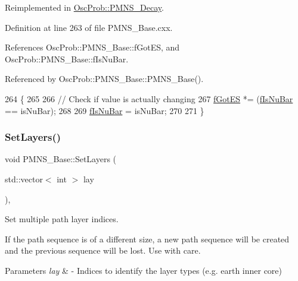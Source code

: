 Reimplemented in \hyperlink{classOscProb_1_1PMNS__Decay_a60b2c35652e73d8f6a087f3f2f3c9de6}{Osc\+Prob\+::\+P\+M\+N\+S\+\_\+\+Decay}.



Definition at line 263 of file P\+M\+N\+S\+\_\+\+Base.\+cxx.



References Osc\+Prob\+::\+P\+M\+N\+S\+\_\+\+Base\+::f\+Got\+ES, and Osc\+Prob\+::\+P\+M\+N\+S\+\_\+\+Base\+::f\+Is\+Nu\+Bar.



Referenced by Osc\+Prob\+::\+P\+M\+N\+S\+\_\+\+Base\+::\+P\+M\+N\+S\+\_\+\+Base().


\begin{DoxyCode}
264 \{
265 
266   \textcolor{comment}{// Check if value is actually changing}
267   \hyperlink{classOscProb_1_1PMNS__Base_a6dc5cd010d2d70b2324745b4e53e9839}{fGotES} *= (\hyperlink{classOscProb_1_1PMNS__Base_a0ebaeaefab36a3ff381c6293faedfdd6}{fIsNuBar} == isNuBar);
268 
269   \hyperlink{classOscProb_1_1PMNS__Base_a0ebaeaefab36a3ff381c6293faedfdd6}{fIsNuBar} = isNuBar;
270 
271 \}
\end{DoxyCode}
\mbox{\label{classOscProb_1_1PMNS__Base_a904e580edf89fb98bf9a6397739b4ebe}} 
\subsubsection{\texorpdfstring{Set\+Layers()}{SetLayers()}}
{\footnotesize\ttfamily void P\+M\+N\+S\+\_\+\+Base\+::\+Set\+Layers (\begin{DoxyParamCaption}\item[{std\+::vector$<$ int $>$}]{lay }\end{DoxyParamCaption})\hspace{0.3cm}{\ttfamily [virtual]}, {\ttfamily [inherited]}}

Set multiple path layer indices.

If the path sequence is of a different size, a new path sequence will be created and the previous sequence will be lost. Use with care.


\begin{DoxyParams}{Parameters}
{\em lay} & -\/ Indices to identify the layer types (e.\+g. earth inner core) \\
\hline
\end{DoxyParams}


